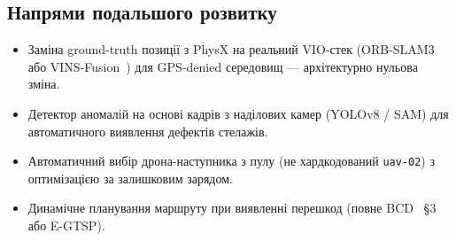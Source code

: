 \subsection*{Напрями подальшого розвитку}

\begin{itemize}[itemsep=3pt]
  \item Заміна ground-truth позиції з PhysX на реальний VIO-стек (ORB-SLAM3~\cite{ORBSLAM3} або VINS-Fusion~\cite{VINSFusion}) для GPS-denied середовищ — архітектурно нульова зміна.
  \item Детектор аномалій на основі кадрів з наділових камер (YOLOv8 / SAM) для автоматичного виявлення дефектів стелажів.
  \item Автоматичний вибір дрона-наступника з пулу (не хардкодований \texttt{uav-02}) з оптимізацією за залишковим зарядом.
  \item Динамічне планування маршруту при виявленні перешкод (повне BCD~\cite{Choset2000} §3 або E-GTSP).
\end{itemize}
